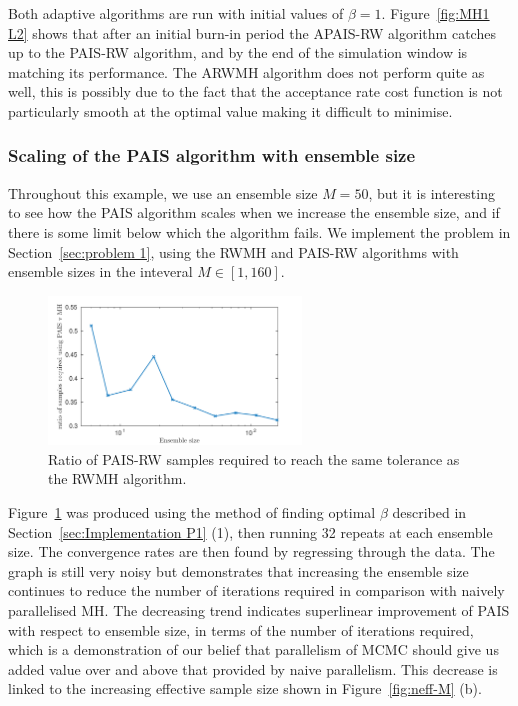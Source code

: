 \documentclass[final]{siamltex}
\begin{document}
Both adaptive algorithms are run with initial values of
$\beta=1$. Figure~\ref{fig:MH1 L2} shows that after an initial burn-in
period the APAIS-RW algorithm catches up to the PAIS-RW algorithm, and
by the end of the simulation window is matching its performance. The
ARWMH algorithm does not perform quite as well, this is possibly due
to the fact that the acceptance rate cost function is not particularly
smooth at the optimal value making it difficult to minimise.

\subsubsection{Scaling of the PAIS algorithm with ensemble size}

Throughout this example, we use an ensemble size $M=50$, but it is interesting to see how the PAIS algorithm scales when we increase the ensemble size, and if there is some limit below which the algorithm fails. We implement the problem in Section~\ref{sec:problem 1}, using the RWMH and PAIS-RW algorithms with ensemble sizes in the inteveral $M \in [1, 160]$.

\begin{figure}[h]
\begin{center}
\includegraphics[width=0.6\textwidth]{"figures/PAIS_saving"}
\caption{Ratio of PAIS-RW samples required to reach the same tolerance as the RWMH algorithm.}
\label{fig:PAIS_saving}
\end{center}
\end{figure}

Figure~\ref{fig:PAIS_saving} was produced using the method of finding
optimal $\beta$ described in Section~\ref{sec:Implementation P1} (1),
then running 32 repeats at each ensemble size. The convergence rates
are then found by regressing through the data. The graph is still very
noisy but demonstrates that increasing the ensemble size continues to
reduce the number of iterations required in comparison with naively
parallelised MH. The decreasing trend indicates superlinear improvement of PAIS with
respect to ensemble size, in terms of the number of iterations
required, which is a demonstration of our belief that parallelism of
MCMC should give us added value over and above that provided by naive parallelism. This decrease is linked to the increasing effective sample size shown in Figure~\ref{fig:neff-M} (b).
\end{document}
